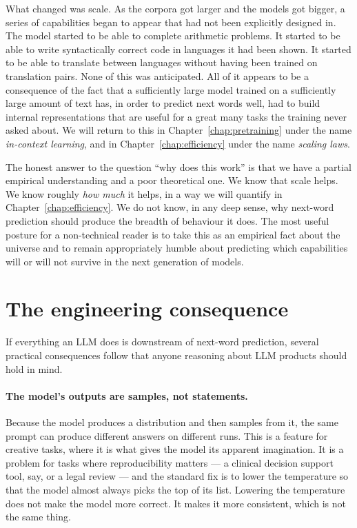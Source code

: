 What changed was scale. As the corpora got larger and the models
got bigger, a series of capabilities began to appear that had
not been explicitly designed in. The model started to be able to
complete arithmetic problems. It started to be able to write
syntactically correct code in languages it had been shown. It
started to be able to translate between languages without
having been trained on translation pairs. None of this was
anticipated. All of it appears to be a consequence of the fact
that a sufficiently large model trained on a sufficiently large
amount of text has, in order to predict next words well, had to
build internal representations that are useful for a great many
tasks the training never asked about. We will return to this in
Chapter~\ref{chap:pretraining} under the name \emph{in-context learning}, and in
Chapter~\ref{chap:efficiency} under the name \emph{scaling laws}.

The honest answer to the question ``why does this work'' is
that we have a partial empirical understanding and a poor
theoretical one. We know that scale helps. We know roughly
\emph{how much} it helps, in a way we will quantify in Chapter~\ref{chap:efficiency}.
We do not know, in any deep sense, why next-word prediction
should produce the breadth of behaviour it does. The most
useful posture for a non-technical reader is to take this as
an empirical fact about the universe and to remain
appropriately humble about predicting which capabilities will
or will not survive in the next generation of models.

\section{The engineering consequence}

If everything an LLM does is downstream of next-word prediction,
several practical consequences follow that anyone reasoning
about LLM products should hold in mind.

\paragraph{The model's outputs are samples, not statements.}
Because the model produces a distribution and then samples from
it, the same prompt can produce different answers on different
runs. This is a feature for creative tasks, where it is what
gives the model its apparent imagination. It is a problem for
tasks where reproducibility matters --- a clinical decision
support tool, say, or a legal review --- and the standard fix
is to lower the temperature so that the model almost always
picks the top of its list. Lowering the temperature does not
make the model more correct. It makes it more consistent, which
is not the same thing.

